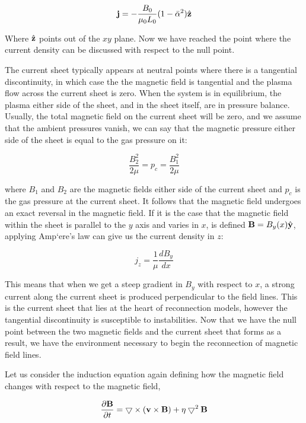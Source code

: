 \begin{equation}
	\mathbf{j} = -\frac{B_0}{\mu_0L_0}(1 - \bar{\alpha}^2)\hat{\mathbf{z}}
\end{equation}

\noindent Where $\hat{\mathbf{z}}$ points out of the $xy$ plane.
Now we have reached the point where the current density can be discussed with respect to the null point.

The current sheet typically appears at neutral points where there is a tangential discontinuity, in which case the the magnetic field is tangential and the plasma flow across the current sheet is zero.
When the system is in equilibrium, the plasma either side of the sheet, and in the sheet itself, are in pressure balance.
Usually, the total magnetic field on the current sheet will be zero, and we assume that the ambient pressures vanish, we can say that the magnetic pressure either side of the sheet is equal to the gas pressure on it:

\begin{equation}
	\frac{B_2^2}{2\mu} = p_c = \frac{B_1^2}{2\mu}
\end{equation}

\noindent where $B_1$ and $B_2$ are the magnetic fields either side of the current sheet and $p_c$ is the gas pressure at the current sheet.
It follows that the magnetic field undergoes an exact reversal in the magnetic field.
If it is the case that the magnetic field within the sheet is parallel to the $y$ axis and varies in $x$, is defined $\mathbf{B} = B_y(x)\hat{\mathbf{y}}$, applying Amp{`e}re's law can give us the current density in $z$:

\begin{equation}
	j_z = \frac{1}{\mu}\frac{dB_y}{dx}
\end{equation}

\noindent This means that when we get a steep gradient in $B_y$ with respect to $x$, a strong current along the current sheet is produced perpendicular to the field lines.
This is the current sheet that lies at the heart of reconnection models, however the tangential discontinuity is susceptible to instabilities.
Now that we have the null point between the two magnetic fields and the current sheet that forms as a result, we have the environment necessary to begin the reconnection of magnetic field lines.

Let us consider the induction equation again defining how the magnetic field changes with respect to the magnetic field,

\begin{equation}
	\frac{\partial \mathbf{B}}{\partial t } = \bigtriangledown \times (\mathbf{v} \times \mathbf{B}) + \eta\bigtriangledown^2\mathbf{B}
\end{equation} 

